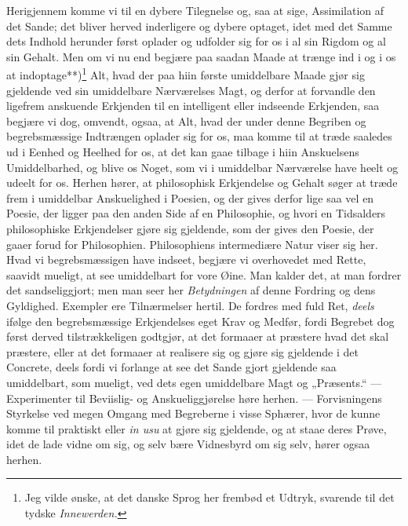 \documentclass[12pt,a4paper]{book}
\newcommand{\apage}[1]{\marginnote{\footnotesize\textit{[#1]}}}
\begin{document}
Herigjennem komme vi til en dybere Tilegnelse og, saa at sige, Assimilation
af det Sande; det bliver herved inderligere og dybere optaget, idet med det
Samme dets Indhold herunder først oplader og udfolder sig for os i al sin
Rigdom og al sin Gehalt. Men om vi nu end begjære paa saadan Maade at
trænge ind i og i os at indoptage**)\footnote{Jeg vilde ønske, at det danske
Sprog her frembød et Udtryk, svarende til det tydske \emph{Innewerden.}} Alt, hvad
der paa hiin første umiddelbare Maade gjør sig gjeldende ved sin
umiddelbare Nærværelses Magt, og derfor at forvandle den ligefrem anskuende
Erkjenden til en intelligent eller indseende Erkjenden, saa begjære vi dog,
omvendt, ogsaa, at Alt, hvad der under denne Begriben og begrebsmæssige
Indtrængen oplader sig for os, maa komme til at træde saaledes ud i Eenhed
og Heelhed for os, at det kan gaae tilbage i hiin Anskuelsens
Umiddelbarhed, og blive os Noget, som vi i umiddelbar Nærværelse have heelt
og udeelt for os. Herhen hører, at \apage{103} philosophisk Erkjendelse og Gehalt søger
at træde frem i umiddelbar Anskuelighed i Poesien, og der gives derfor lige
saa vel en Poesie, der ligger paa den anden Side af en Philosophie, og hvori
en Tidsalders philosophiske Erkjendelser gjøre sig gjeldende, som der gives
den Poesie, der gaaer forud for Philosophien. Philosophiens intermediære
Natur viser sig her. Hvad vi begrebsmæssigen have indseet, begjære vi
overhovedet med Rette, saavidt mueligt, at see umiddelbart for vore Øine.
Man kalder det, at man fordrer det sandseliggjort; men man seer her
\emph{Betydningen} af denne Fordring og dens Gyldighed. Exempler ere Tilnærmelser
hertil. De fordres med fuld Ret, \emph{deels} ifølge den begrebsmæssige
Erkjendelses eget Krav og Medfør, fordi Begrebet dog først derved
tilstrækkeligen godtgjør, at det formaaer at præstere hvad det skal
præstere, eller at det formaaer at realisere sig og gjøre sig gjeldende i det
Concrete, deels fordi vi forlange at see det Sande gjort gjeldende saa
umiddelbart, som mueligt, ved dets egen umiddelbare Magt og „Præsents.“ ---
Experimenter til Beviislig- og Anskueliggjørelse høre herhen. ---
Forvisningens Styrkelse ved megen Omgang med Begreberne i visse Sphærer, hvor
de kunne komme til praktiskt eller \textit{in usu} at gjøre sig gjeldende, og
at staae deres Prøve, idet de lade vidne om sig, og selv bære Vidnesbyrd om
sig selv, hører ogsaa herhen.
\end{document}
